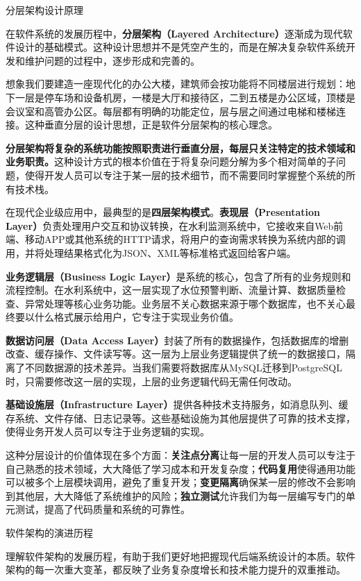  分层架构设计原理

在软件系统的发展历程中，\textbf{分层架构（Layered Architecture）}逐渐成为现代软件设计的基础模式。这种设计思想并不是凭空产生的，而是在解决复杂软件系统开发和维护问题的过程中，逐步形成和完善的。

想象我们要建造一座现代化的办公大楼，建筑师会按功能将不同楼层进行规划：地下一层是停车场和设备机房，一楼是大厅和接待区，二到五楼是办公区域，顶楼是会议室和高管办公区。每层都有明确的功能定位，层与层之间通过电梯和楼梯连接。这种垂直分层的设计思想，正是软件分层架构的核心理念。

\textbf{分层架构将复杂的系统功能按照职责进行垂直分层，每层只关注特定的技术领域和业务职责。}这种设计方式的根本价值在于将复杂问题分解为多个相对简单的子问题，使得开发人员可以专注于某一层的技术细节，而不需要同时掌握整个系统的所有技术栈。

在现代企业级应用中，最典型的是\textbf{四层架构模式}。\textbf{表现层（Presentation Layer）}负责处理用户交互和协议转换，在水利监测系统中，它接收来自Web前端、移动APP或其他系统的HTTP请求，将用户的查询需求转换为系统内部的调用，并将处理结果格式化为JSON、XML等标准格式返回给客户端。

\textbf{业务逻辑层（Business Logic Layer）}是系统的核心，包含了所有的业务规则和流程控制。在水利系统中，这一层实现了水位预警判断、流量计算、数据质量检查、异常处理等核心业务功能。业务层不关心数据来源于哪个数据库，也不关心最终要以什么格式展示给用户，它专注于实现业务价值。

\textbf{数据访问层（Data Access Layer）}封装了所有的数据操作，包括数据库的增删改查、缓存操作、文件读写等。这一层为上层业务逻辑提供了统一的数据接口，隔离了不同数据源的技术差异。当我们需要将数据库从MySQL迁移到PostgreSQL时，只需要修改这一层的实现，上层的业务逻辑代码无需任何改动。

\textbf{基础设施层（Infrastructure Layer）}提供各种技术支持服务，如消息队列、缓存系统、文件存储、日志记录等。这些基础设施为其他层提供了可靠的技术支撑，使得业务开发人员可以专注于业务逻辑的实现。

这种分层设计的价值体现在多个方面：\textbf{关注点分离}让每一层的开发人员可以专注于自己熟悉的技术领域，大大降低了学习成本和开发复杂度；\textbf{代码复用}使得通用功能可以被多个上层模块调用，避免了重复开发；\textbf{变更隔离}确保某一层的修改不会影响到其他层，大大降低了系统维护的风险；\textbf{独立测试}允许我们为每一层编写专门的单元测试，提高了代码质量和系统的可靠性。

 软件架构的演进历程

理解软件架构的发展历程，有助于我们更好地把握现代后端系统设计的本质。软件架构的每一次重大变革，都反映了业务复杂度增长和技术能力提升的双重推动。


